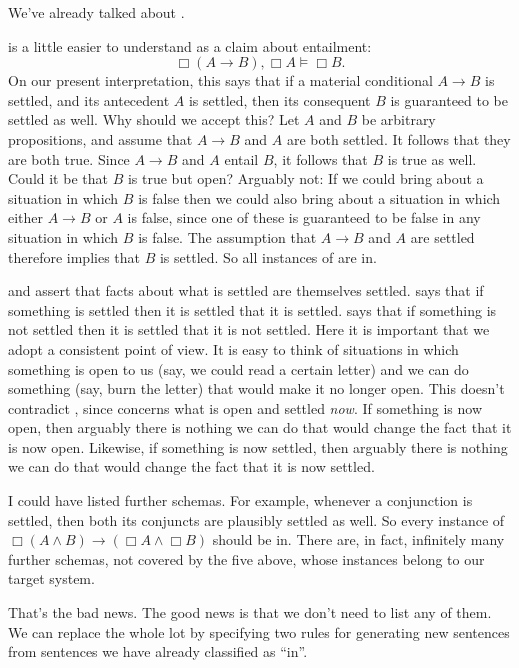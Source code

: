 We've already talked about .

 is a little easier to understand as a claim about entailment:
\[
  \Box(A \to B), \Box A \models \Box B.
\]
On our present interpretation, this says that if a material conditional $A\to B$
is settled, and its antecedent $A$ is settled, then its consequent $B$ is
guaranteed to be settled as well. Why should we accept this? Let $A$ and
$B$ be arbitrary propositions, and assume that $A\to B$ and $A$ are both
settled. It follows that they are both true. Since $A\to B$ and $A$ entail $B$,
it follows that $B$ is true as well. Could it be that $B$ is true but open?
Arguably not: If we could bring about a situation in which $B$ is false then we
could also bring about a situation in which either $A\to B$ or $A$ is false,
since one of these is guaranteed to be false in any situation in which $B$ is
false. The assumption that $A\to B$ and $A$ are settled therefore implies that
$B$ is settled. So all instances of  are in.


 and  assert that facts about what is settled are themselves
settled.  says that if something is settled then it is settled that it is
settled.  says that if something is not settled then it is settled that it
is not settled. Here it is important that we adopt a consistent point of view.
It is easy to think of situations in which something is open to us (say, we
could read a certain letter) and we can do something (say, burn the letter) that
would make it no longer open. This doesn't contradict , since 
concerns what is open and settled \emph{now}. If something is now open, then
arguably there is nothing we can do that would change the fact that it is now
open. Likewise, if something is now settled, then arguably there is nothing we
can do that would change the fact that it is now settled.

I could have listed further schemas. For example, whenever a conjunction is
settled, then both its conjuncts are plausibly settled as well. So every
instance of $\Box(A\land B) \to (\Box A \land \Box B)$ should be in. There are,
in fact, infinitely many further schemas, not covered by the five above, whose
instances belong to our target system.

That's the bad news. The good news is that we don't need to list any of them. We
can replace the whole lot by specifying two rules for generating new sentences
from sentences we have already classified as ``in''.

